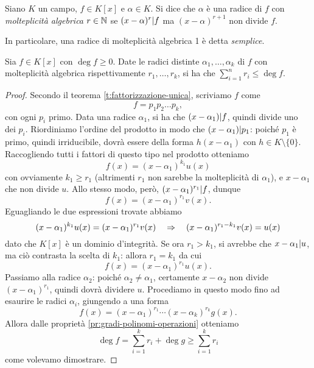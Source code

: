 \begin{definizione} \label{d:molteplicita-algebrica-radice}
	Siano $K$ un campo, $f\in K[x]$ e $\alpha\in K$.
	Si dice che $\alpha$ è una radice di $f$ con \emph{molteplicità algebrica} $r\in \mathbb{N}$ se $(x-\alpha)^r| f$ ma $(x-\alpha)^{r+1}$ non divide $f$.
\end{definizione}
In particolare, una radice di molteplicità algebrica 1 è detta \emph{semplice}.
\begin{teorema}\label{dimensione-molteplicita-algebrica}
	Sia $f\in K[x]$ con $\deg f\ge 0$.
	Date le radici distinte $\alpha_1,\dots,\alpha_k$ di $f$ con molteplicità algebrica rispettivamente $r_1,\dots,r_k$, si ha che $\sum_{i=1}^n r_i\le\deg f$.
\end{teorema}
\begin{proof}
	Secondo il teorema \ref{t:fattorizzazione-unica}, scriviamo $f$ come
	\begin{equation}
		f = p_1p_2\dots p_k,
	\end{equation}
	con ogni $p_i$ primo.
	Data una radice $\alpha_1$, si ha che $(x-\alpha_1)| f$, quindi divide uno dei $p_i$.
	Riordiniamo l'ordine del prodotto in modo che $(x-\alpha_1)| p_1$: poich\'e $p_1$ è primo, quindi irriducibile, dovrà essere della forma $h(x-\alpha_1)$ con $h\in K\setminus\{0\}$.
	Raccogliendo tutti i fattori di questo tipo nel prodotto otteniamo
	\begin{equation}
		f(x)=(x-\alpha_1)^{k_1}u(x)
	\end{equation}
	con ovviamente $k_1\ge r_1$ (altrimenti $r_1$ non sarebbe la molteplicità di $\alpha_1$), e $x-\alpha_1$ che non divide $u$.
	Allo stesso modo, però, $(x-\alpha_1)^{r_1}| f$, dunque
	\begin{equation}
		f(x)=(x-\alpha_1)^{r_1}v(x).
	\end{equation}
	Eguagliando le due espressioni trovate abbiamo
	\begin{equation}
		(x-\alpha_1)^{k_1}u(x)=(x-\alpha_1)^{r_1}v(x)\quad\Rightarrow\quad (x-\alpha_1)^{r_1-k_1}v(x)=u(x)
	\end{equation}
	dato che $K[x]$ è un dominio d'integrità.
	Se ora $r_1>k_1$, si avrebbe che $x-\alpha_1| u$, ma ciò contrasta la scelta di $k_1$: allora $r_1=k_1$ da cui
	\begin{equation}
		f(x)=(x-\alpha_1)^{r_1}u(x).
	\end{equation}
	Passiamo alla radice $\alpha_2$: poich\'e $\alpha_2\ne\alpha_1$, certamente $x-\alpha_2$ non divide $(x-\alpha_1)^{r_1}$, quindi dovrà dividere $u$.
	Procediamo in questo modo fino ad esaurire le radici $\alpha_i$, giungendo a una forma
	\begin{equation}
		f(x)=(x-\alpha_1)^{r_1}\cdots(x-\alpha_k)^{r_k}g(x).
	\end{equation}
	Allora dalle proprietà \ref{pr:gradi-polinomi-operazioni} otteniamo
	\begin{equation}
		\deg f=\sum_{i=1}^kr_i+\deg g\ge\sum_{i=1}^kr_i
	\end{equation}
	come volevamo dimostrare.
\end{proof}

